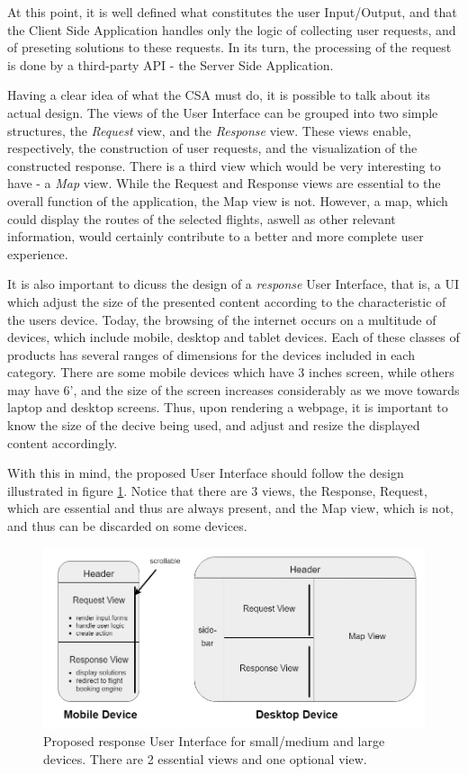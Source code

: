 At this point, it is well defined what constitutes the user Input/Output,
and that the Client Side Application handles only the logic of collecting user requests,
and of preseting solutions to these requests. In its turn, the processing of the request 
is done by a third-party API - the Server Side Application.

Having a clear idea of what the CSA must do, it is possible to talk about its actual design.
The views of the User Interface can be grouped into two simple structures, the \textit{Request} view,
and the \textit{Response} view. These views enable, respectively, the construction of user requests,
and the visualization of the constructed response. There is a third view which would be very interesting to have - a \textit{Map} view.
While the Request and Response views are essential to the overall function of the application,
the Map view is not. However, a map, which could display the routes of the selected flights, aswell as other relevant information,
would certainly contribute to a better and more complete user experience.

It is also important to dicuss the design of a \textit{response} User Interface,
that is, a UI which adjust the size of the presented content according to the characteristic of the users device.
Today, the browsing of the internet occurs on a multitude of devices, which include mobile, desktop and tablet devices.
Each of these classes of products has several ranges of dimensions for the devices included in each category.
There are some mobile devices which have 3 inches screen, while others may have 6', and 
the size of the screen increases considerably as we move towards laptop and desktop screens.
Thus, upon rendering a webpage, it is important to know the size of the decive being used,
and adjust and resize the displayed content accordingly.

With this in mind, the proposed User Interface should follow the design illustrated in figure \ref{fig:UI_design}.
Notice that there are 3 views, the Response, Request, which are essential and thus are always present,
and the Map view, which is not, and thus can be discarded on some devices.


\begin{figure}[htpb]
  \centering
  \includegraphics[width=\textwidth]{./Figures/system_design/UI_design.png}
  \caption{Proposed response User Interface for small/medium and large devices. 
  There are 2 essential views and one optional view.}
  \label{fig:UI_design}
\end{figure}




